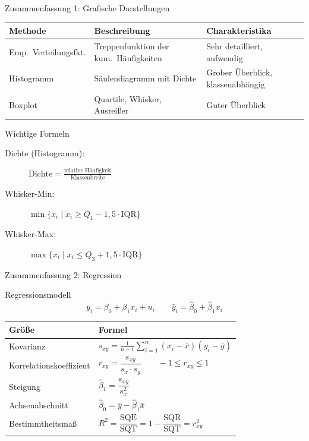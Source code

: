 \documentclass[aspectratio=169,11pt]{beamer}
\begin{document}
\begin{frame}{Zusammenfassung 1: Grafische Darstellungen}
  \begin{center}
    \small
    \renewcommand{\arraystretch}{1.4}
    \begin{tabular}{l|l|l}
      \toprule
      \textbf{Methode} & \textbf{Beschreibung} & \textbf{Charakteristika} \\
      \midrule
      Emp.\ Verteilungsfkt. & Treppenfunktion der kum.\ Häufigkeiten & Sehr detailliert, aufwendig \\
      Histogramm & Säulendiagramm mit Dichte & Grober Überblick, klassenabhängig \\
      Boxplot & Quartile, Whisker, Ausreißer & Guter Überblick \\
      \bottomrule
    \end{tabular}
  \end{center}

  \begin{block}{Wichtige Formeln}
    \begin{description}
      \item[Dichte (Histogramm):] $\text{Dichte} = \frac{\text{relative Häufigkeit}}{\text{Klassenbreite}}$
      \item[Whisker-Min:] $\min\{x_i \mid x_i \geq Q_1 - 1{,}5 \cdot \text{IQR}\}$
      \item[Whisker-Max:] $\max\{x_i \mid x_i \leq Q_3 + 1{,}5 \cdot \text{IQR}\}$
    \end{description}
  \end{block}
\end{frame}

\begin{frame}{Zusammenfassung 2: Regression}
  \begin{block}{Regressionsmodell}
    \[ y_i = \beta_0 + \beta_1 x_i + u_i \qquad \hat{y}_i = \hat{\beta}_0 + \hat{\beta}_1 x_i \]
  \end{block}

  \begin{center}
    \renewcommand{\arraystretch}{1.25}
    \begin{tabular}{l|l}
      \toprule
      \textbf{Größe} & \textbf{Formel} \\
      \midrule
      Kovarianz & $s_{xy} = \frac{1}{n-1}\sum_{i=1}^{n}(x_i - \bar{x})(y_i - \bar{y})$ \\[4pt]
      Korrelationskoeffizient & $r_{xy} = \dfrac{s_{xy}}{s_x \cdot s_y} \qquad -1 \leq r_{xy} \leq 1$ \\[4pt]
      Steigung & $\hat{\beta}_1 = \dfrac{s_{xy}}{s_x^2}$ \\[4pt]
      Achsenabschnitt & $\hat{\beta}_0 = \bar{y} - \hat{\beta}_1 \bar{x}$ \\[4pt]
      Bestimmtheitsmaß & $R^2 = \dfrac{\text{SQE}}{\text{SQT}} = 1 - \dfrac{\text{SQR}}{\text{SQT}} = r_{xy}^2$ \\
      \bottomrule
    \end{tabular}
  \end{center}
\end{frame}
\end{document}
